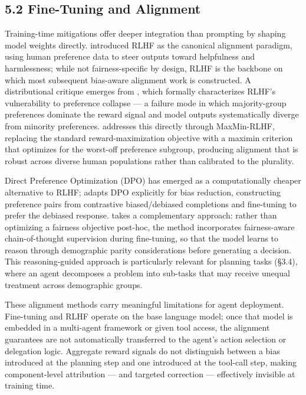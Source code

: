 \documentclass[sigconf,nonacm]{acmart}
\begin{document}
\subsection{5.2 Fine-Tuning and Alignment}

Training-time mitigations offer deeper integration than prompting by shaping model weights directly. \cite{ouyang2022training} introduced RLHF as the canonical alignment paradigm, using human preference data to steer outputs toward helpfulness and harmlessness; while not fairness-specific by design, RLHF is the backbone on which most subsequent bias-aware alignment work is constructed. A distributional critique emerges from \cite{xiao2024algorithmic}, which formally characterizes RLHF's vulnerability to preference collapse — a failure mode in which majority-group preferences dominate the reward signal and model outputs systematically diverge from minority preferences. \cite{chakraborty2024maxmin} addresses this directly through MaxMin-RLHF, replacing the standard reward-maximization objective with a maximin criterion that optimizes for the worst-off preference subgroup, producing alignment that is robust across diverse human populations rather than calibrated to the plurality.

Direct Preference Optimization (DPO) has emerged as a computationally cheaper alternative to RLHF; \cite{allam2024biasdpo} adapts DPO explicitly for bias reduction, constructing preference pairs from contrastive biased/debiased completions and fine-tuning to prefer the debiased response. \cite{kabra2025reasoning} takes a complementary approach: rather than optimizing a fairness objective post-hoc, the method incorporates fairness-aware chain-of-thought supervision during fine-tuning, so that the model learns to reason through demographic parity considerations before generating a decision. This reasoning-guided approach is particularly relevant for planning tasks (§3.4), where an agent decomposes a problem into sub-tasks that may receive unequal treatment across demographic groups.

These alignment methods carry meaningful limitations for agent deployment. Fine-tuning and RLHF operate on the base language model; once that model is embedded in a multi-agent framework or given tool access, the alignment guarantees are not automatically transferred to the agent's action selection or delegation logic. Aggregate reward signals do not distinguish between a bias introduced at the planning step and one introduced at the tool-call step, making component-level attribution — and targeted correction — effectively invisible at training time.
\end{document}
